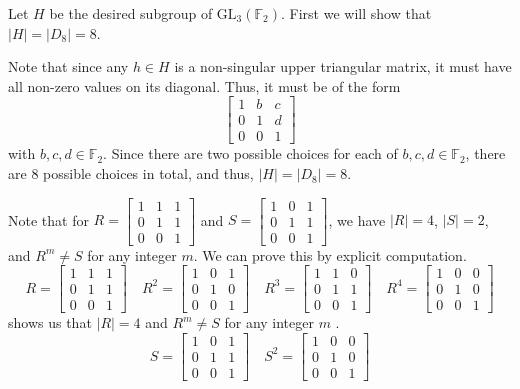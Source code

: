 \documentclass[12 pt, letterpaper]{hmcpset}
\begin{document}
\begin{solution}
	Let $H$ be the desired subgroup of $\mathrm{GL}_{3}(\mathbb{F}_{2})$. First we will show that $\lvert H \rvert = \lvert D_{8} \rvert = 8$. 

	Note that since any $h \in H$ is a non-singular upper triangular matrix, it must have all non-zero values on its diagonal. Thus, it must be of the form
	\[
		\begin{bmatrix}
			1 & b & c \\
			0 & 1 & d \\
			0 & 0 & 1
		\end{bmatrix}
	\]
	with $b, c, d \in \mathbb{F}_{2}$. Since there are two possible choices for each of $b, c, d \in \mathbb{F}_{2}$, there are $8$ possible choices in total, and thus, $\lvert H \rvert = \lvert D_{8} \rvert = 8$. 

	Note that for $R = 
	\begin{bmatrix}
		1 & 1 & 1 \\
		0 & 1 & 1 \\
		0 & 0 & 1
	\end{bmatrix}$ 
	and $S = 
	\begin{bmatrix}
		1 & 0 & 1 \\
		0 & 1 & 1 \\
		0 & 0 & 1
	\end{bmatrix}$, we have $\lvert R \rvert = 4$, $\lvert S \rvert = 2$, and $R^{m} \neq S$ for any integer $m$. We can prove this by explicit computation.
	\[
			R = \begin{bmatrix}
			1 & 1 & 1 \\
			0 & 1 & 1 \\
			0 & 0 & 1
			\end{bmatrix} \quad
			R^{2} = 
			\begin{bmatrix}
				1 & 0 & 1 \\
				0 & 1 & 0 \\
				0 & 0 & 1
			\end{bmatrix} \quad
			R^{3} = 
			\begin{bmatrix}
				1 & 1 & 0 \\
				0 & 1 & 1 \\
				0 & 0 & 1
			\end{bmatrix} \quad
			R^{4} = 
			\begin{bmatrix}
				1 & 0 & 0 \\
				0 & 1 & 0 \\
				0 & 0 & 1
			\end{bmatrix}
	\]
	shows us that $\lvert R \rvert = 4$  and $R^{m} \neq S$  for any integer $m$ .
	\[
		S = 
		\begin{bmatrix}
			1 & 0 & 1 \\
			0 & 1 & 1 \\
			0 & 0 & 1 
		\end{bmatrix} \quad
		S^{2} = 
		\begin{bmatrix}
			1 & 0 & 0 \\
			0 & 1 & 0 \\
			0 & 0 & 1
		\end{bmatrix}
	\] 


\end{solution}
\end{document}
